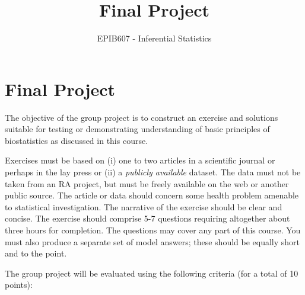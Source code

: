 \documentclass[letterpaper,12pt,twoside,]{pinp}
\title{Final Project}
\author[a]{EPIB607 - Inferential Statistics}
\affil[a]{Fall 2021, McGill University}
\begin{document}
\verticaladjustment{-2pt}

\maketitle
\thispagestyle{firststyle}



\hypertarget{final-project}{%
\section{Final Project}\label{final-project}}

The objective of the group project is to construct an exercise and
solutions suitable for testing or demonstrating understanding of basic
principles of biostatistics as discussed in this course.

\vspace*{.3in}

Exercises must be based on (i) one to two articles in a scientific
journal or perhaps in the lay press or (ii) a
\textit{publicly available} dataset. The data must not be taken from an
RA project, but must be freely available on the web or another public
source. The article or data should concern some health problem amenable
to statistical investigation. The narrative of the exercise should be
clear and concise. The exercise should comprise 5-7 questions requiring
altogether about three hours for completion. The questions may cover any
part of this course. You must also produce a separate set of model
answers; these should be equally short and to the point.

\vspace*{.15in}

The group project will be evaluated using the following criteria (for a
total of 10 points):
\end{document}
